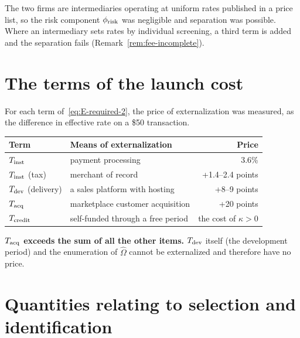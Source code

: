 The two firms are intermediaries operating at uniform rates published in a price list, so the
risk component $\phi_{\rm risk}$ was negligible and separation was possible. Where an
intermediary sets rates by individual screening, a third term is added and the separation
fails (Remark~\ref{rem:fee-incomplete}).

\section{The terms of the launch cost}

For each term of~\eqref{eq:E-required-2}, the price of externalization was measured, as the
difference in effective rate on a \$50 transaction.

\begin{center}
\begin{tabular}{@{}llr@{}}
\toprule
Term & Means of externalization & Price \\
\midrule
$T_{\rm inst}$ & payment processing & 3.6\% \\
$T_{\rm inst}$ (tax) & merchant of record & +1.4--2.4 points \\
$T_{\rm dev}$ (delivery) & a sales platform with hosting & +8--9 points \\
$T_{\rm acq}$ & marketplace customer acquisition & +20 points \\
$T_{\rm credit}$ & self-funded through a free period & the cost of $\kappa>0$ \\
\bottomrule
\end{tabular}
\label{tab:launch-cost-externalization}
\end{center}

\textbf{$T_{\rm acq}$ exceeds the sum of all the other items.}
$T_{\rm dev}$ itself (the development period) and the enumeration of $\hat\Omega$ cannot be
externalized and therefore have no price.

\section{Quantities relating to selection and identification}

